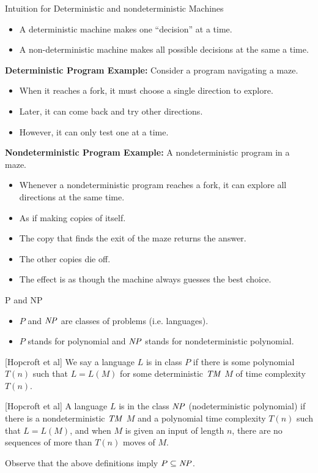 \documentclass[style=sailor,size=12pt]{powerdot}
\begin{document}
\begin{wideslide}[bm=,toc=]{Intuition for Deterministic and nondeterministic Machines}
\begin{itemize}
\item A deterministic machine makes one ``decision'' at a time.
\item A non-deterministic machine makes all possible decisions at the same a time.
\end{itemize}
{\bf Deterministic Program Example:} Consider a program navigating a maze. 
\begin{itemize}
\item When it reaches a fork, it must choose a single direction to explore.
\item Later, it can come back and try other directions. 
\item However, it can only test one at a time.
\end{itemize}

{\bf Nondeterministic Program Example:} A nondeterministic program in a maze. 
\begin{itemize}
\item Whenever a nondeterministic program reaches a fork, it can explore all
directions at the same time. 
\item As if making copies of itself. 
\item The copy that finds the exit of the maze returns the answer.
\item The other copies die off. 
\item The effect is as though the machine always guesses the best choice.
\end{itemize}

\end{wideslide}

\begin{wideslide}[bm=,toc=]{P and NP}
\begin{itemize}
\item $P$ and $\mathit{NP}$ are classes of problems (i.e. languages).
\item $P$ stands for polynomial and $\mathit{NP}$ stands for nondeterministic
polynomial.
\end{itemize}
\begin{defn}{}[Hopcroft et al]
We say a language $L$ is in class $P$ if there is some polynomial $T(n)$ such
that $L = L(M)$ for some deterministic $\mathit{TM}$ $M$ of time complexity
$T(n)$. 
\end{defn}

\begin{defn}{}[Hopcroft et al]
A language $L$ is in the class $\mathit{NP}$ (nodeterministic polynomial) if there
is a nondeterministic $\mathit{TM}$ $M$ and a polynomial time complexity $T(n)$
such that $L = L(M)$, and when $M$ is given an input of length $n$, there are
no sequences of more than $T(n)$ moves of $M$.
\end{defn}
Observe that the above definitions imply $P \subseteq \mathit{NP}$.
\end{wideslide}
\end{document}
